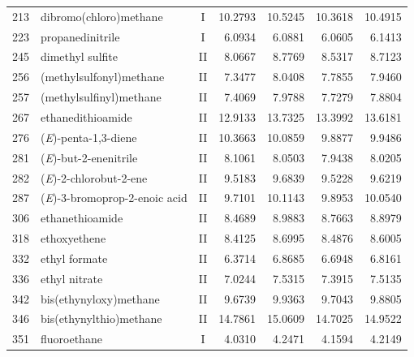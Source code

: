\begin{longtable}{rlcd{2.5}d{2.5}d{2.5}d{2.5}}
    213  & dibromo(chloro)methane                                 & I  & 10.2793 & 10.5245 & 10.3618 & 10.4915 \\
    223  & propanedinitrile                                       & I  & 6.0934  & 6.0881  & 6.0605  & 6.1413  \\
    245  & dimethyl sulfite                                       & II & 8.0667  & 8.7769  & 8.5317  & 8.7123  \\
    256  & (methylsulfonyl)methane                                & II & 7.3477  & 8.0408  & 7.7855  & 7.9460  \\
    257  & (methylsulfinyl)methane                                & II & 7.4069  & 7.9788  & 7.7279  & 7.8804  \\
    267  & ethanedithioamide                                      & II & 12.9133 & 13.7325 & 13.3992 & 13.6181 \\
    276  & (\textit{E})-penta-1,3-diene                           & II & 10.3663 & 10.0859 & 9.8877  & 9.9486  \\
    281  & (\textit{E})-but-2-enenitrile                          & II & 8.1061  & 8.0503  & 7.9438  & 8.0205  \\
    282  & (\textit{E})-2-chlorobut-2-ene                         & II & 9.5183  & 9.6839  & 9.5228  & 9.6219  \\
    287  & (\textit{E})-3-bromoprop-2-enoic   acid                & II & 9.7101  & 10.1143 & 9.8953  & 10.0540 \\
    306  & ethanethioamide                                        & II & 8.4689  & 8.9883  & 8.7663  & 8.8979  \\
    318  & ethoxyethene                                           & II & 8.4125  & 8.6995  & 8.4876  & 8.6005  \\
    332  & ethyl formate                                          & II & 6.3714  & 6.8685  & 6.6948  & 6.8161  \\
    336  & ethyl nitrate                                          & II & 7.0244  & 7.5315  & 7.3915  & 7.5135  \\
    342  & bis(ethynyloxy)methane                                 & II & 9.6739  & 9.9363  & 9.7043  & 9.8805  \\
    346  & bis(ethynylthio)methane                                & II & 14.7861 & 15.0609 & 14.7025 & 14.9522 \\
    351  & fluoroethane                                           & I  & 4.0310  & 4.2471  & 4.1594  & 4.2149  \\

\end{longtable}
